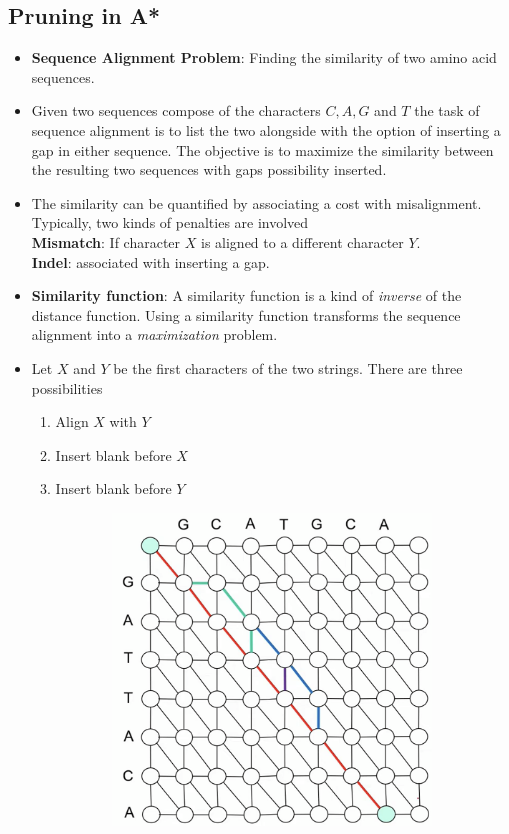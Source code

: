 \documentclass[a4paper]{article}
\begin{document}
\subsection{Pruning in A*}
\begin{itemize}
    \item \textbf{Sequence Alignment Problem}: Finding the similarity of two amino acid sequences.
    \item Given two sequences compose of the characters $C,A,G$ and $T$ the task of sequence alignment is to list the two alongside with the option of inserting a gap in either sequence. The objective is to maximize the similarity between the resulting two sequences with gaps possibility inserted.
    \item The similarity can be quantified by associating a cost with misalignment. Typically, two kinds of penalties are involved\\
    \textbf{Mismatch}: If character $X$ is aligned to a different character $Y$.\\
    \textbf{Indel}: associated with inserting a gap.
    \item \textbf{Similarity function}: A similarity function is a kind of \textit{inverse} of the distance function. Using a similarity function transforms the sequence alignment into a \textit{maximization} problem.
    \item Let $X$ and $Y$ be the first characters of the two strings. There are three possibilities
    \begin{enumerate}
        \item Align $X$ with $Y$
        \item Insert blank before $X$
        \item Insert blank before $Y$
    \end{enumerate}
    \begin{figure}[H]
        \centering
        \begin{subfigure}[b]{0.45\linewidth}
            \includegraphics[width=\textwidth]{Degree//static/AI_sequence_alignment.png}

\end{subfigure}
\end{figure}
\end{itemize}
\end{document}
